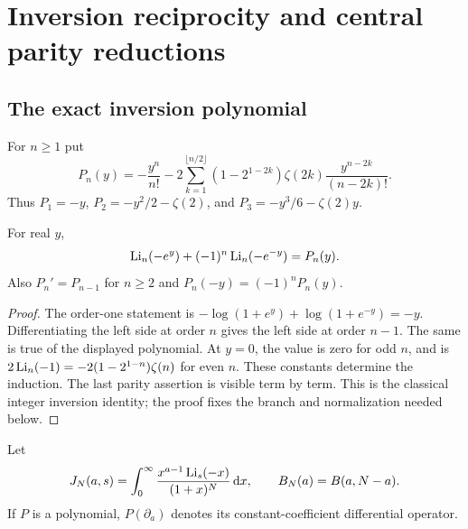 \section{Inversion reciprocity and central parity reductions}
\label{bmh:sec:reciprocity}

\subsection{The exact inversion polynomial}
For $n\ge1$ put
\begin{equation}\label{bmh:eq:Pn}
 P_n(y)=-\frac{y^n}{n!}
 -2\sum_{k=1}^{\lfloor n/2\rfloor}
 (1-2^{1-2k})\zeta(2k)\frac{y^{n-2k}}{(n-2k)!}.
\end{equation}
Thus $P_1=-y$, $P_2=-y^2/2-\zeta(2)$, and
$P_3=-y^3/6-\zeta(2)y$.

\begin{lemma}\label{bmh:lem:inversion}
For real $y$,
\begin{equation}\label{bmh:eq:inversion}
 \operatorname{Li}_n(-e^y)+(-1)^n\operatorname{Li}_n(-e^{-y})=P_n(y).
\end{equation}
Also $P_n'=P_{n-1}$ for $n\ge2$ and
$P_n(-y)=(-1)^nP_n(y)$.
\end{lemma}
\begin{proof}
The order-one statement is
$-\log(1+e^y)+\log(1+e^{-y})=-y$.
Differentiating the left side at order $n$ gives the left side at
order $n-1$. The same is true of the displayed polynomial.
At $y=0$, the value is zero for odd $n$, and is
$2\operatorname{Li}_n(-1)=-2(1-2^{1-n})\zeta(n)$ for even $n$.
These constants determine the induction. The last parity assertion is
visible term by term. This is the classical integer inversion identity;
the proof fixes the branch and normalization needed below.
\end{proof}

Let
\begin{equation}\label{bmh:eq:JandBeta}
 J_N(a,s)=\int_0^\infty\frac{x^{a-1}\operatorname{Li}_s(-x)}{(1+x)^N}\,\mathrm d x,
 \qquad B_N(a)=B(a,N-a).
\end{equation}
If $P$ is a polynomial, $P(\partial_a)$ denotes its constant-coefficient
differential operator.

